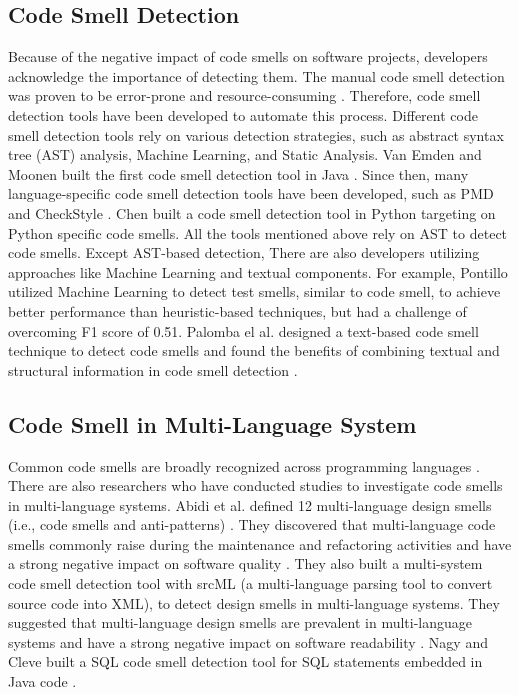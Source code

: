 \subsection{Code Smell Detection}
\label{sec:Code Smell Detection}
Because of the negative impact of code smells on software projects, developers acknowledge the importance of detecting them. The manual code smell detection was proven to be
error-prone and resource-consuming \cite{DetectingDefectsInObject}. Therefore, code smell detection tools have been developed to automate this process.
Different code smell detection tools rely on various detection strategies, such as abstract syntax tree (AST) analysis, Machine Learning, and Static Analysis.
Van Emden and Moonen built the first code smell detection tool in Java \cite{1173068}. Since then,
many language-specific code smell detection tools have been developed, such as PMD \cite{PMD} and CheckStyle \cite{CheckStyle}.
Chen \cite{Pysmell} built a code smell detection tool in Python targeting on Python specific code smells.
All the tools mentioned above rely on AST to detect code smells. Except AST-based detection, There are also developers utilizing approaches like Machine Learning and textual components.
For example, Pontillo utilized Machine Learning to detect test smells, similar to code smell, to achieve better performance than heuristic-based techniques, but had a challenge of overcoming F1 score of 0.51.
Palomba el al. designed a text-based code smell technique to detect code smells and found the benefits of combining textual and structural information in code smell detection \cite{Palomba}.
\subsection{Code Smell in Multi-Language System}
\label{sec: Code Smell in Multi-Language System}

Common code smells are broadly recognized across programming languages \cite{PMD,CheckStyle,Pysmell,Jscent,DesigniteJava}.
There are also researchers who have conducted studies to investigate code smells in multi-language systems.
Abidi et al. defined 12 multi-language design smells (i.e., code smells and anti-patterns) \cite{MultiLanguageCodeSmells}. They discovered that multi-language code smells commonly raise during the maintenance and refactoring activities
 and have a strong negative impact on software quality \cite{Abidi2}. They also built a multi-system code smell detection tool with srcML (a multi-language parsing tool to convert source code into XML), to
 detect design smells in multi-language systems. They suggested that multi-language design smells are prevalent in multi-language systems and have a strong negative impact on software readability \cite{Fault-Prone}.
Nagy and Cleve built a SQL code smell detection tool for SQL statements embedded in Java code \cite{SQLInJava}.
